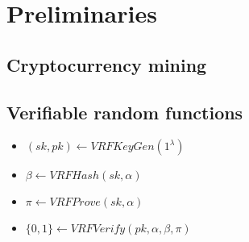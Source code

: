 \section{Preliminaries}

\subsection{Cryptocurrency mining}




\subsection{Verifiable random functions}



\begin{itemize}
    \item $(sk, pk) \leftarrow VRFKeyGen(1^{\lambda})$
    \item $\beta \leftarrow VRFHash(sk, \alpha)$
    \item $\pi \leftarrow VRFProve(sk, \alpha)$
    \item $\{0, 1\} \leftarrow VRFVerify(pk, \alpha, \beta, \pi)$
\end{itemize}
